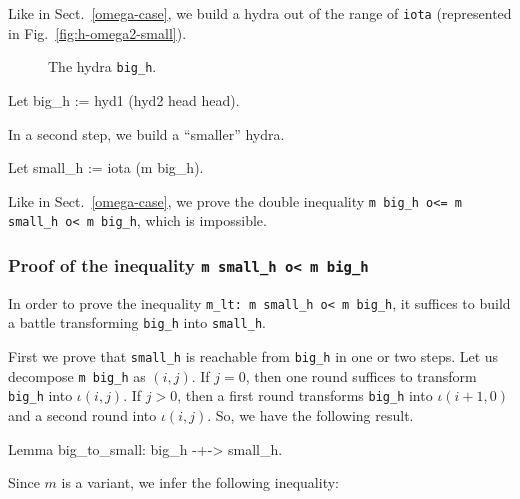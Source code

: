 \documentclass[a4paper]{book}
\begin{document}
Like in Sect.~\ref{omega-case}, we build a hydra out of the range of \texttt{iota} (represented in Fig.~\vref{fig:h-omega2-small}).

\begin{figure}[htb]
\centering
{}
\caption{\label{fig:h-omega2-small}}
 The hydra \texttt{big\_h}.
\end{figure}


\begin{Coqsrc}
   Let big_h := hyd1 (hyd2 head head).  
\end{Coqsrc}
 
 In a second step, we build a ``smaller'' hydra.
 
\begin{Coqsrc}
   Let small_h := iota (m big_h).
\end{Coqsrc}

Like in Sect.~\ref{omega-case}, we prove the double inequality \texttt{m big\_h o<= m small\_h o< m big\_h}, which is impossible.

\subsubsection{Proof of the inequality \texttt{m small\_h o< m big\_h}}

In order to prove the inequality  \texttt{m\_lt: m small\_h o< m big\_h}, it suffices to
build a battle transforming \texttt{big\_h} into \texttt{small\_h}.

First we prove that \texttt{small\_h} is reachable from \texttt{big\_h} in one or two steps. Let us decompose \texttt{m big\_h} as $(i,j)$.
If $j=0$, then one round suffices to transform \texttt{big\_h} into $\iota(i,j)$.
If $j>0$, then a first round transforms \texttt{big\_h} into $\iota(i+1,0)$ and a second round into $\iota(i,j)$. So, we have the following result.

\begin{Coqsrc}
Lemma big_to_small: big_h -+-> small_h.
\end{Coqsrc}

Since $m$ is a variant, we infer the following inequality:
\end{document}
